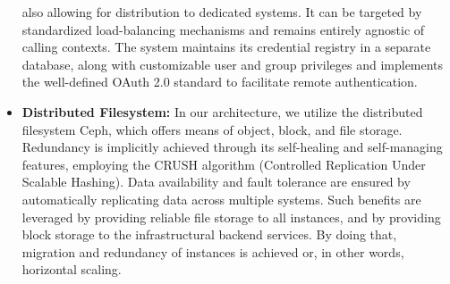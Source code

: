 \documentclass[runningheads]{llncs}
\begin{document}
\begin{itemize}
	      also allowing for distribution to dedicated systems.
	      It can be targeted by standardized load-balancing mechanisms
	      and remains entirely agnostic of calling contexts.
	      The system maintains its credential registry in a separate database,
	      along with customizable user and group privileges and implements
	      the well-defined OAuth 2.0 standard to facilitate remote authentication.
	\item \textbf{Distributed Filesystem:}
	      In our architecture, we utilize the distributed filesystem Ceph,
	      which offers means of object, block, and file storage.
	      Redundancy is implicitly achieved
	      through its self-healing and self-managing features, employing
	      the CRUSH algorithm (Controlled Replication Under Scalable Hashing).
	      Data availability and fault tolerance are ensured
	      by automatically replicating data across multiple systems.
	      Such benefits are leveraged by providing reliable file storage to all instances,
	      and by providing block storage to the infrastructural backend services.
	      By doing that, migration and redundancy of instances is achieved
	      or, in other words, horizontal scaling.
\end{itemize}
\end{document}
